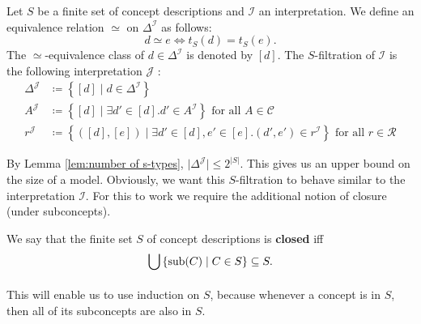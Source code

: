\begin{definition}[$S$-filtration]
	Let $S$ be a finite set of concept descriptions and $\mathcal{I}$ an interpretation.
	We define an equivalence relation $\simeq$ on $\Delta^{\mathcal{I}}$ as follows:
	\[
		d \simeq e \iff t_S(d) = t_S(e)
	.\]
	The $\simeq$-equivalence class of  $d \in \Delta^{\mathcal{I}}$ is denoted by $\left[ d \right]$.
	The $S$-filtration of $\mathcal{I}$ is the following interpretation $\mathcal{J}$ :
	\begin{align*}
		\Delta^{\mathcal{J}} &\coloneqq \left\{ [d] \mid d \in \Delta^{\mathcal{I}} \right\} \\
		A^\mathcal{J} &\coloneqq \left\{ [d] \mid \exists d' \in [d]. d' \in A^{\mathcal{I}} \right\} \text{ for all } A \in \mathscr{C} \\
		r^\mathcal{J} &\coloneqq \left\{ \left( [d],[e] \right) \mid \exists d' \in [d], e' \in [e]. (d',e') \in r^\mathcal{I}\right\} \text{ for all } r \in \mathscr{R}
	\end{align*}
\end{definition}
\begin{note}
	By Lemma \ref{lem:number of s-types}, $\lvert \Delta^{\mathcal{J}} \rvert \leq 2^{\lvert S \rvert}$.
	This gives us an upper bound on the size of a model.
	Obviously, we want this $S$-filtration to behave similar to the interpretation $\mathcal{I}$.
	For this to work we require the additional notion of closure (under subconcepts).
\end{note}

We say that the finite set $S$ of concept descriptions is \textbf{closed} iff
\[
	\bigcup_{} \left\{ \operatorname{\text{sub}}(C) \mid C \in S \right\} \subseteq S
.\]
This will enable us to use induction on $S$, because whenever a concept is in $S$, then all of its subconcepts are also in $S$.

